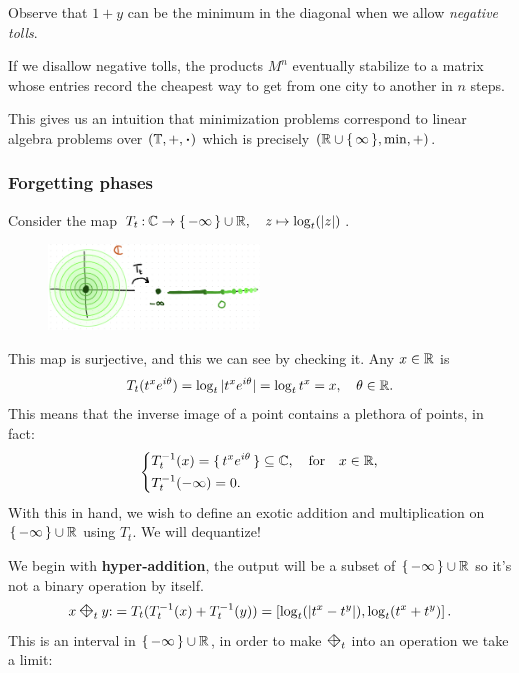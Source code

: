 \documentclass[12pt]{memoir}
\newcommand{\diamondplus}{\mathbin{\rotatebox[origin=c]{45}{$\boxtimes$}}} %
\begin{document}
Observe that $1+y$ can be the minimum in the diagonal when we allow \emph{negative tolls}.
\begin{Rmk}
If we disallow negative tolls, the products $M^n$ eventually stabilize to a matrix whose entries record the cheapest way to get from one city to another in $n$ steps.
\end{Rmk}
This gives us an intuition that minimization problems correspond to linear algebra problems over $(\bT,+,\.)$ which is precisely $(\mathbb{R}\cup\{\,\infty\,\},\min,+)$.

\subsubsection{Forgetting phases}

Consider the map $T_t\mathbin{:}\mathbb{C}\to\{\,-\infty\,\}\cup\mathbb{R},\quad z\mapsto\log_t(|z|)$.
\begin{figure}[h!]
    \centering
    \includegraphics[width=0.5\textwidth]{figs/fig1-3.png}
\end{figure}
This map is surjective, and this we can see by checking it. Any $x\in\mathbb{R}$ is 
$$T_t(t^xe^{i\theta})=\log_t|t^xe^{i\theta}|=\log_tt^x=x,\quad\theta\in\mathbb{R}.$$
This means that the inverse image of a point contains a plethora of points, in fact:
$$
\left\lbrace
\begin{aligned}
    &T_t^{-1}(x)=\{\,t^xe^{i\theta}\,\}\subseteq\mathbb{C},\quad\text{for}\quad x\in\mathbb{R},\\
    &T_t^{-1}(-\infty)=0.
\end{aligned}
\right.
$$
With this in hand, we wish to define an exotic addition and multiplication on $\{\,-\infty\,\}\cup\mathbb{R}$ using $T_t$. We will dequantize!\par 
We begin with \textbf{hyper-addition}, the output will be a subset of $\{\,-\infty\,\}\cup\mathbb{R}$ so it's not a binary operation by itself. 
$$x\diamondplus_t y\:= T_t(T_t^{-1}(x)+T_t^{-1}(y))=\bonj{\log_t(|t^x-t^y|),\log_t(t^x+t^y)}.\label{problem1-hyperAddition}$$
This is an interval in $\{\,-\infty\,\}\cup\mathbb{R}$, in order to make $\diamondplus_t$ into an operation we take a limit:
\end{document}
